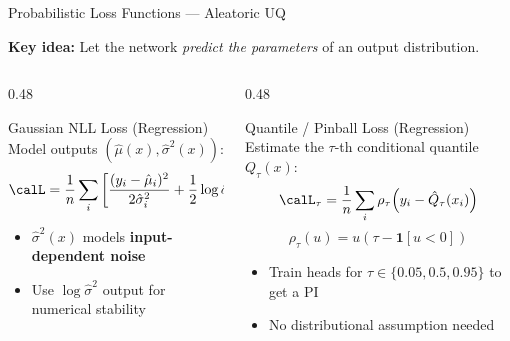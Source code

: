 \documentclass[aspectratio=169]{beamer}
\begin{document}
\begin{frame}{Probabilistic Loss Functions — Aleatoric UQ}

  \textbf{Key idea:} Let the network \emph{predict the parameters} of an output
  distribution.


  \begin{columns}[T]
    \begin{column}{0.48\textwidth}
      \begin{block}{Gaussian NLL Loss (Regression)}
        Model outputs $(\hat\mu(x), \hat\sigma^2(x))$:
        \[
          \calL = \frac{1}{n}\sum_i \left[
            \frac{(y_i - \hat\mu_i)^2}{2\hat\sigma_i^2}
            + \frac{1}{2}\log \hat\sigma_i^2
          \right]
        \]
        \begin{itemize}
          \item $\hat\sigma^2(x)$ models \textbf{input-dependent noise}
          \item Use $\log \hat\sigma^2$ output for numerical stability
        \end{itemize}
      \end{block}
    \end{column}
    \begin{column}{0.48\textwidth}
      \begin{block}{Quantile / Pinball Loss (Regression)}
        Estimate the $\tau$-th conditional quantile $Q_\tau(x)$:
        \[
          \calL_\tau = \frac{1}{n}\sum_i \rho_\tau\!\left(y_i - \hat Q_\tau(x_i)\right)
        \]
        \[
          \rho_\tau(u) = u(\tau - \mathbf{1}[u < 0])
        \]
        \begin{itemize}
          \item Train heads for $\tau \in \{0.05, 0.5, 0.95\}$ to get a PI
          \item No distributional assumption needed
        \end{itemize}
      \end{block}
    \end{column}
  \end{columns}


\end{frame}
\end{document}
